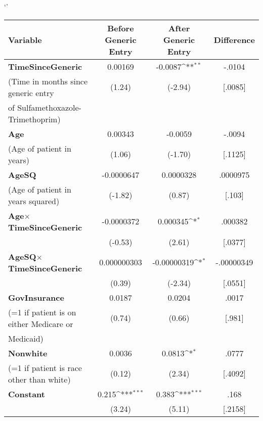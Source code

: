 \def\sym#1{\ifmmode^{#1}\else\(^{#1}\)\fi}`'
\begin{tabular}{l*{3}{c}}
\hline\hline
Variable            &\multicolumn{1}{c}{Before Generic Entry}&\multicolumn{1}{c}{After Generic Entry}&\multicolumn{1}{c}{Difference}\\
\hline
\textbf{TimeSinceGeneric}&                            0.00169         &     -0.0087\sym{**} & -.0104\\
(Time in months since generic entry            &      (1.24)         &     (-2.94) & [.0085]\\
of Sulfamethoxazole-Trimethoprim)\\
[1em]
\textbf{Age}         &                      0.00343         &    -0.0059 & -.0094\\
(Age of patient in years)            &      (1.06)         &     (-1.70) & [.1125]\\
[1em]
\textbf{AgeSQ}       &                             -0.0000647         &   0.0000328 & .0000975\\
(Age of patient in years squared)            &     (-1.82)         &      (0.87) & [.103]\\
[1em]
\textbf{Age}$\times$\textbf{TimeSinceGeneric}      &  -0.0000372         &    0.000345\sym{*}& .000382 \\
            &                                          (-0.53)         &      (2.61)         & [.0377]\\
[1em]
\textbf{AgeSQ}$\times$\textbf{TimeSinceGeneric}    & 0.000000303         & -0.00000319\sym{*}  & -.00000349\\
            &                                        (0.39)         &     (-2.34)         & [.0551]\\
[1em]
\textbf{GovInsurance}&                                    0.0187         &      0.0204         & .0017\\
(=1 if patient is on either Medicare or            &      (0.74)         &      (0.66)         & [.981]\\
Medicaid)\\
[1em]
\textbf{Nonwhite}    &                                     0.0036         &      0.0813\sym{*}  & .0777\\
(=1 if patient is race other than white)            &      (0.12)         &      (2.34)         & [.4092]\\
[1em]
\textbf{Constant}      &       0.215\sym{***}&       0.383\sym{***} & .168\\
            &                (3.24)         &      (5.11)         & [.2158] \\

\end{tabular}
